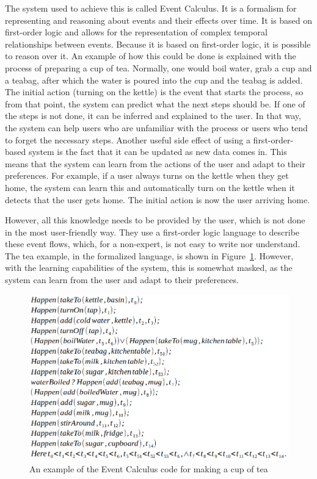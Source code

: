 \documentclass[11pt,a4paper]{report}
\begin{document}
The system used to achieve this is called Event Calculus. It is a formalism for representing and reasoning about events and their effects over time. It is based on first-order logic and allows for the representation of complex temporal relationships between events. Because it is based on first-order logic, it is possible to reason over it. An example of how this could be done is explained with the process of preparing a cup of tea. Normally, one would boil water, grab a cup and a teabag, after which the water is poured into the cup and the teabag is added. The initial action (turning on the kettle) is the event that starts the process, so from that point, the system can predict what the next steps should be. If one of the steps is not done, it can be inferred and explained to the user. In that way, the system can help users who are unfamiliar with the process or users who tend to forget the necessary steps. Another useful side effect of using a first-order-based system is the fact that it can be updated as new data comes in. This means that the system can learn from the actions of the user and adapt to their preferences. For example, if a user always turns on the kettle when they get home, the system can learn this and automatically turn on the kettle when it detects that the user gets home. The initial action is now the user arriving home.

However, all this knowledge needs to be provided by the user, which is not done in the most user-friendly way. They use a first-order logic language to describe these event flows, which, for a non-expert, is not easy to write nor understand. The tea example, in the formalized language, is shown in Figure~\ref{fig:event_code}. However, with the learning capabilities of the system, this is somewhat masked, as the system can learn from the user and adapt to their preferences.

\begin{figure}
    \centering
    \includegraphics[width=0.8\linewidth]{images/event_code.png}
    \caption{An example of the Event Calculus code for making a cup of tea~\cite{SOTA_EventCalculus}}
    \label{fig:event_code}
\end{figure}
\end{document}

